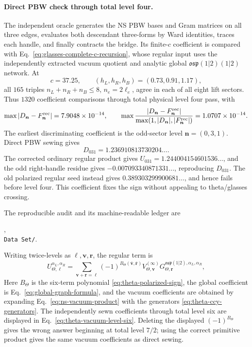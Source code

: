 \documentclass[11pt]{article}
\newcommand{\osp}{\mathfrak{osp}(1|2)}
\begin{document}
\paragraph{Direct PBW check through total level four.}
The independent oracle generates the NS PBW bases and Gram matrices on all
three edges, evaluates both descendant three-forms by Ward identities, traces
each handle, and finally contracts the bridge.  Its finite-\(c\) coefficient is
compared with Eq.~\eqref{eq:glasses-complete-c-recursion}, whose regular input
uses the independently extracted vacuum quotient and analytic global
\(\osp(1|2)\) network.  At
\begin{equation}
 c=37.25,\qquad (h_L,h_R,h_B)=(0.73,0.91,1.17),
\end{equation}
all \(165\) triples
\(n_L+n_R+n_B\le8\), \(n_e=2\ell_e\), agree in each of all eight lift
sectors.  Thus \(1320\) coefficient comparisons through total physical level
four pass, with
\begin{equation}
 \max|D_{\bm n}-F^{\rm rec}_{\bm n}|
 =7.9048\times10^{-14},\qquad
 \max\frac{|D_{\bm n}-F^{\rm rec}_{\bm n}|}
              {\max(1,|D_{\bm n}|,|F^{\rm rec}_{\bm n}|)}
 =1.0707\times10^{-14}.
 \label{eq:glasses-level-four-pbw-result}
\end{equation}
The earliest discriminating coefficient is the odd-sector level
\(\bm n=(0,3,1)\).  Direct PBW sewing gives
\begin{equation}
 D_{031}=1.236910813730204\ldots.
\end{equation}
The corrected ordinary regular product gives
\(U_{031}=1.244004154601536\ldots\), and the odd right-handle residue gives
\(-0.007093340871331\ldots\), reproducing \(D_{031}\).  The old polarized
regular seed instead gives \(0.389303299900681\ldots\), and hence fails before
level four.  This coefficient fixes the sign without appealing to
theta/glasses crossing.

The reproducible audit and its machine-readable ledger are
\begin{center}
 ,\\
 \texttt{Data Set/}.
\end{center}

Writing twice-levels as \(\bm\ell,\bm v,\bm r\), the regular term is
\begin{equation}
 \boxed{
 U_{\Theta,\bm\ell}^{\alpha_L,\alpha_R}
 =\sum_{\bm v+\bm r=\bm\ell}
 (-1)^{B_\Theta(\bar{\bm v},\bar{\bm r})}
 V_{\Theta,\bm v}^{(\infty)}
 G_{\Theta,\bm r}^{\osp,\alpha_L,\alpha_R},}
 \label{eq:theta-seed}
\end{equation}
Here \(B_\Theta\) is the six-term polynomial
\eqref{eq:theta-polarized-sign}, the global coefficient is
Eq.~\eqref{eq:global-graph-formula}, and the vacuum coefficients are obtained
by expanding Eq.~\eqref{eq:ns-vacuum-product} with the generators
\eqref{eq:theta-ccy-generators}.  The independently sewn coefficients through
total level six are displayed in Eq.~\eqref{eq:theta-vacuum-level-six}.
Deleting the displayed \((-1)^{B_\Theta}\) gives the wrong answer beginning
at total level \(7/2\); using the correct primitive product gives the same
vacuum coefficients as direct sewing.
\end{document}
